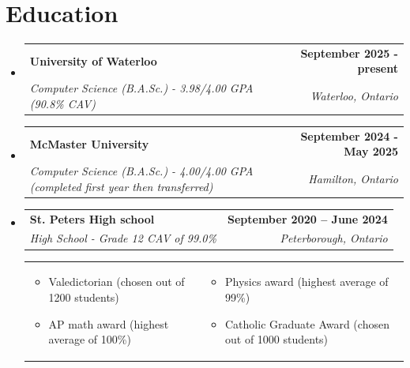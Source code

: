 \documentclass[letterpaper,11pt]{article}
\makeatletter
\newcommand{\resumeItem}[1]{
  \item\small{
    {#1 \vspace{-2pt}}
  }
}
\newcommand{\resumeSubheading}[4]{
  \vspace{-2pt}\item
    \begin{tabular*}{1.0\textwidth}[t]{l@{\extracolsep{\fill}}r}
      \textbf{#1} & \textbf{\small #2} \\
      \textit{\small#3} & \textit{\small #4} \\
    \end{tabular*}\vspace{-7pt}
}
\newcommand{\resumeSubHeadingListStart}{\begin{itemize}[leftmargin=0.0in, label={}]}
\newcommand{\resumeSubHeadingListEnd}{\end{itemize}}
\newcommand{\resumeItemListStart}{\begin{itemize}}
\newcommand{\resumeItemListEnd}{\end{itemize}\vspace{-5pt}}
\makeatother
\begin{document}
\section{Education}
  \resumeSubHeadingListStart
  \resumeSubheading
      {University of Waterloo}{September 2025 - present}
{Computer Science (B.A.Sc.) - 3.98/4.00 GPA (90.8\% CAV)} {Waterloo, Ontario}
  
  \resumeSubheading
      {McMaster University}{September 2024 - May 2025}
{Computer Science (B.A.Sc.) - 4.00/4.00 GPA (completed first year then transferred)} {Hamilton, Ontario}
  
  \resumeSubheading
      {St. Peters High school}{September 2020 -- June 2024}
      {High School - Grade 12 CAV of 99.0\%}{Peterborough, Ontario}
      
      \begin{tabularx}{1\textwidth} { 
               >{\raggedright\arraybackslash}X 
               >{\raggedright\arraybackslash}X }
            \vspace{-15pt}
             \resumeItemListStart
                \resumeItem{Valedictorian (chosen out of 1200 students)} 
                \resumeItem{AP math award (highest average of 100\%)}
            \resumeItemListEnd 
             &
             \vspace{ -15pt}
             \resumeItemListStart
                \resumeItem{Physics award (highest average of 99\%)}
                \resumeItem{Catholic Graduate Award (chosen out of 1000 students)}
             \resumeItemListEnd 
            \end{tabularx}
            \vspace{-25pt}
    \resumeSubHeadingListEnd
\end{document}
